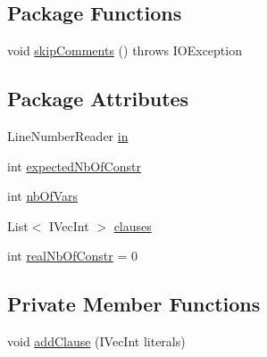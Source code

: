 \subsection*{Package Functions}
\begin{DoxyCompactItemize}
\item 
void \hyperlink{classedu_1_1pku_1_1id_1_1_wcnf_file_reader_a8488ffe065c1cd2f90ce2bc4f3d9f473}{skipComments} ()  throws IOException 
\end{DoxyCompactItemize}
\subsection*{Package Attributes}
\begin{DoxyCompactItemize}
\item 
LineNumberReader \hyperlink{classedu_1_1pku_1_1id_1_1_wcnf_file_reader_a3182838f96a068bdbd4df989489d99ef}{in}
\item 
int \hyperlink{classedu_1_1pku_1_1id_1_1_wcnf_file_reader_ac763d0289c26b167a37a0ee4a069ddd1}{expectedNbOfConstr}
\item 
int \hyperlink{classedu_1_1pku_1_1id_1_1_wcnf_file_reader_a5ea7e3a588f1bc784840c8665fd08b88}{nbOfVars}
\item 
List$<$ IVecInt $>$ \hyperlink{classedu_1_1pku_1_1id_1_1_wcnf_file_reader_aeaaed9fb9028bfc0ae5ff2bc1ef0bc79}{clauses}
\item 
int \hyperlink{classedu_1_1pku_1_1id_1_1_wcnf_file_reader_a69dca8d66af7dedf837d4349175b5709}{realNbOfConstr} = 0
\end{DoxyCompactItemize}
\subsection*{Private Member Functions}
\begin{DoxyCompactItemize}
\item 
void \hyperlink{classedu_1_1pku_1_1id_1_1_wcnf_file_reader_aeccac79bd794c028f166a9569aff9f8e}{addClause} (IVecInt literals)
\end{DoxyCompactItemize}


